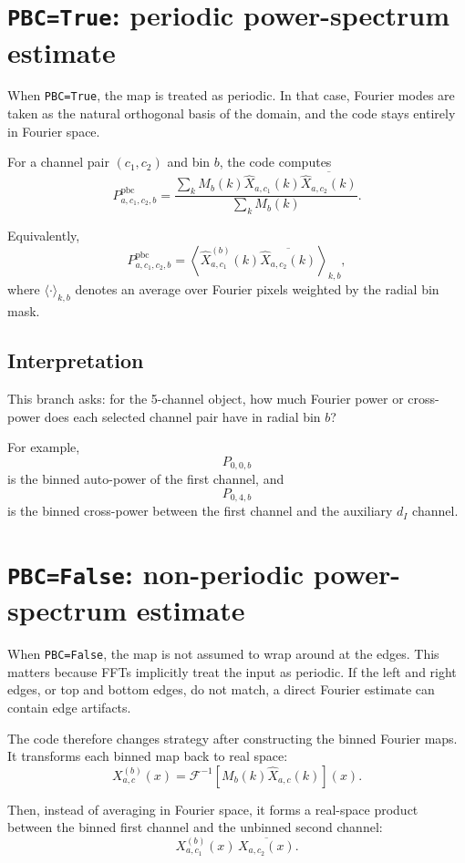 \documentclass[11pt]{article}
\begin{document}
\section{\texttt{PBC=True}: periodic power-spectrum estimate}

When \texttt{PBC=True}, the map is treated as periodic. In that case, Fourier
modes are taken as the natural orthogonal basis of the domain, and the code
stays entirely in Fourier space.

For a channel pair $(c_1,c_2)$ and bin $b$, the code computes
\[
  P^{\mathrm{pbc}}_{a,c_1,c_2,b}
  =
  \frac{
    \sum_k
    M_b(k)\widehat X_{a,c_1}(k)
    \overline{\widehat X_{a,c_2}(k)}
  }{
    \sum_k M_b(k)
  }.
\]

Equivalently,
\[
  P^{\mathrm{pbc}}_{a,c_1,c_2,b}
  =
  \left\langle
    \widehat X^{(b)}_{a,c_1}(k)
    \overline{\widehat X_{a,c_2}(k)}
  \right\rangle_{k,b},
\]
where $\langle\cdot\rangle_{k,b}$ denotes an average over Fourier pixels
weighted by the radial bin mask.

\subsection*{Interpretation}

This branch asks: for the 5-channel object, how much Fourier power or
cross-power does each selected channel pair have in radial bin $b$?

For example,
\[
  P_{0,0,b}
\]
is the binned auto-power of the first channel, and
\[
  P_{0,4,b}
\]
is the binned cross-power between the first channel and the auxiliary
$d_I$ channel.

\section{\texttt{PBC=False}: non-periodic power-spectrum estimate}

When \texttt{PBC=False}, the map is not assumed to wrap around at the edges.
This matters because FFTs implicitly treat the input as periodic. If the left
and right edges, or top and bottom edges, do not match, a direct Fourier
estimate can contain edge artifacts.

The code therefore changes strategy after constructing the binned Fourier maps.
It transforms each binned map back to real space:
\[
  X^{(b)}_{a,c}(x)
  =
  \mathcal{F}^{-1}
  \left[
    M_b(k)\widehat X_{a,c}(k)
  \right](x).
\]

Then, instead of averaging in Fourier space, it forms a real-space product
between the binned first channel and the unbinned second channel:
\[
  X^{(b)}_{a,c_1}(x)\,\overline{X_{a,c_2}(x)}.
\]
\end{document}
